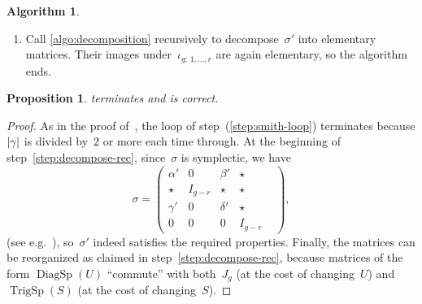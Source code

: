 \documentclass[12pt,oneside]{amsart}
\numberwithin{equation}{section}
\newtheorem{prop}[equation]{Proposition}
\theoremstyle{definition}
\newtheorem{algorithm}[equation]{Algorithm}
\newcommand{\embedsp}[2]{\iota_{#1;\,#2}}
\DeclareMathOperator{\TrigSp}{TrigSp}
\DeclareMathOperator{\DiagSp}{DiagSp}
\DeclarePairedDelimiter{\abs}{|}{|}
\begin{document}
\begin{algorithm}
\begin{enumerate}
    upper left $r\times r$ blocks of~$\alpha,\beta,\gamma,\delta$
    respectively. The $2r\times 2r$ matrix~$\sigma'$ with $r\times r$
    blocks~$\alpha',\beta',\gamma',\delta'$ is symplectic, and moreover
    $\embedsp{g}{1,\ldots,r}(\sigma')^{-1} \sigma$ is block upper-triangular,
    i.e.~of the form $\DiagSp(U)\TrigSp(S)$ for some matrices $U,S$.
    Reorganizing the matrices of steps \eqref{step:smith}--\eqref{step:hnf}, we
    have decomposed the original~$\sigma$ as a product of the form
    \begin{align*}
      &\DiagSp(U_1) \TrigSp(S_1)\, \embedsp{g}{1,\ldots,r}(\sigma') \DiagSp(U_2) \cdot\\
      &\qquad\qquad\TrigSp(S_2) J_g \TrigSp(S_3) J_g \cdots J_g\TrigSp(S_r) \cdot (I_{2g} \text{ or } J_g)
    \end{align*}
    for certain $g\times g$ matrices~$U_1,U_2,S_1,S_2,S_3,\ldots,S_r$.
  \item Call \cref{algo:decomposition} recursively to decompose~$\sigma'$ into
    elementary matrices. Their images under~$\embedsp{g}{1,\ldots,r}$ are again
    elementary, so the algorithm ends.
  \end{enumerate}
\end{algorithm}

\begin{prop}
  \label{prop:decomposition}  terminates and is
  correct.
\end{prop}

\begin{proof}
  As in the proof of~\cite[Lemma 15 p.\,45]{igusaThetaFunctions1972}, the loop
  of step~(\ref{step:smith-loop}) terminates because $\abs{\gamma}$ is divided
  by~$2$ or more each time through. At the beginning of
  step~\eqref{step:decompose-rec}, since~$\sigma$ is symplectic, we have
  \begin{displaymath}
    \sigma =
    \begin{pmatrix}
      \alpha' & 0 & \beta' & \star \\
          \star   & I_{g-r}  & \star & \star & \\
      \gamma' & 0 & \delta' & \star \\
      0 & 0 & 0 & I_{g-r}
    \end{pmatrix},
  \end{displaymath}
  (see e.g.~\cite[Lemma 14 p.\,45]{igusaThetaFunctions1972}), so~$\sigma'$
  indeed satisfies the required properties. Finally, the matrices can be
  reorganized as claimed in step~\eqref{step:decompose-rec}, because matrices
  of the form $\DiagSp(U)$ ``commute'' with both~$J_g$ (at the cost of
  changing~$U$) and~$\TrigSp(S)$ (at the cost of changing~$S$).
\end{proof}
\end{document}
